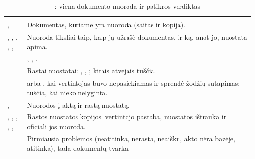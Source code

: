\begin{xltabular}{\textwidth}{@{}L{38mm}Y@{}}
\caption{: viena dokumento nuoroda ir patikros verdiktas}\label{tab:data:rc}\\
\toprule
{} &  \\
\midrule
\endfirsthead
\toprule
{} &  \\
\midrule
\endhead
\bottomrule
\endlastfoot
{},  & Dokumentas, kuriame yra nuoroda (saitas ir kopija). \\
, , , , ,  & Nuoroda tiksliai taip, kaip ją užrašė dokumentas, ir ką, anot jo, nuostata apima. \\
 & , , . \\
 & Rastai nuostatai: , , ; kitais atvejais tuščia. \\
 &  arba , kai vertintojas buvo nepasiekiamas ir sprendė žodžių sutapimas; tuščia, kai nieko nelyginta. \\
,  & Nuorodos į aktą ir rastą nuostatą. \\
, , , , ,  & Rastos nuostatos kopijos, vertintojo pastaba, nuostatos ištrauka ir oficiali jos nuoroda. \\
 & Pirmiausia problemos (neatitinka, nerasta, neaišku, akto nėra bazėje, atitinka), tada dokumentų tvarka. \\
\end{xltabular}

